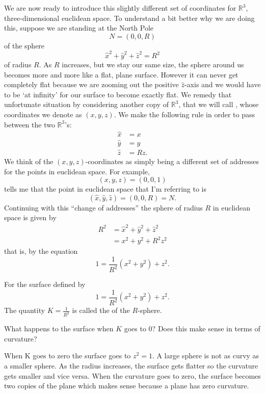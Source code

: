 \documentclass{ximera}
\begin{document}
We are now ready to introduce this slightly different set of coordinates for
$\mathbb{R}^{3}$, three-dimensional euclidean space. To understand a bit better why we are doing this,
suppose we are standing at the North Pole%
\[
N=\left(0,0,R\right)
\]
of the sphere%
\[
\hat{x}^{2}+\hat{y}^{2}+\hat{z}^{2}=R^{2} %
\]
of radius $R$. As $R$ increases, but we stay our same size, the sphere
around us becomes more and more like a flat, plane surface. However it
can never get completely flat because we are zooming out the positive
$\hat{z}$-axis and we would have to be `at infinity' for our surface
to become exactly flat. We remedy that unfortunate situation by
considering another copy of $\mathbb{R}^{3}$, that we will call
, whose coordinates we denote as
$\left( x,y,z\right) $.  We make the following rule in order to pass
between the two $\mathbb{R}^{3}$'s:%
\begin{align*}
\hat{x}  &  =x\\
\hat{y}  &  =y\\
\hat{z}  &  =Rz.
\end{align*}
We think of the $\left( x,y,z\right) $-coordinates as simply being a
different set of addresses for the points in euclidean space. For
example,
\[
\left(x,y,z\right)  =\left(0,0,1\right)
\]
tells me that the point in euclidean space that I'm referring to is%
\[
\left(\hat{x},\hat{y},\hat{z}\right) =\left( 0,0,R\right)= N.
\]
Continuing with this ``change of addresses'' the sphere of radius $R$
in euclidean space is given by
\begin{align*}
R^{2} & =\hat{x}^{2}+\hat{y}^{2}+\hat{z}^{2}\\ &
=x^{2}+y^{2}+R^{2}z^{2}
\end{align*}
that is, by the equation
\[
1=\frac{1}{R^{2}}\left(  x^{2}+y^{2}\right)  +z^{2}. %
\]
\begin{definition}
  For the surface defined by
  \[
  1=\frac{1}{R^{2}}\left(  x^{2}+y^{2}\right)  +z^{2}. %
  \]
The quantity $K=\frac{1}{R^{2}}$ is called the  of the
$R$-sphere.
\end{definition}

\begin{problem}
  What happens to the surface when $K$ goes to $0$? Does this make
  sense in terms of curvature?
  
\begin{freeResponse}
When K goes to zero the surface goes to $z^{2} =1$.  A large sphere is not as curvy as a smaller sphere. As the radius increases, the surface gets flatter so the curvature gets smaller and vice versa.  When the curvature goes to zero, the surface becomes two copies of the plane which makes sense because a plane has zero curvature.  
\end{freeResponse}

\end{problem}
\end{document}
